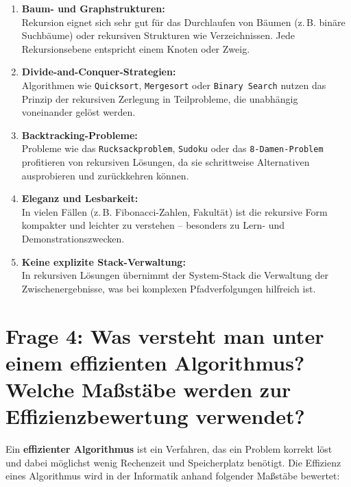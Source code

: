 \documentclass{article}
\begin{document}
	\begin{enumerate}
		\item \textbf{Baum- und Graphstrukturen:} \\
		Rekursion eignet sich sehr gut für das Durchlaufen von Bäumen (z.\,B. binäre Suchbäume) oder rekursiven Strukturen wie Verzeichnissen. Jede Rekursionsebene entspricht einem Knoten oder Zweig.
		
		\item \textbf{Divide-and-Conquer-Strategien:} \\
		Algorithmen wie \texttt{Quicksort}, \texttt{Mergesort} oder \texttt{Binary Search} nutzen das Prinzip der rekursiven Zerlegung in Teilprobleme, die unabhängig voneinander gelöst werden.
		
		\item \textbf{Backtracking-Probleme:} \\
		Probleme wie das \texttt{Rucksackproblem}, \texttt{Sudoku} oder das \texttt{8-Damen-Problem} profitieren von rekursiven Lösungen, da sie schrittweise Alternativen ausprobieren und zurückkehren können.
		
		\item \textbf{Eleganz und Lesbarkeit:} \\
		In vielen Fällen (z.\,B. Fibonacci-Zahlen, Fakultät) ist die rekursive Form kompakter und leichter zu verstehen – besonders zu Lern- und Demonstrationszwecken.
		
		\item \textbf{Keine explizite Stack-Verwaltung:} \\
		In rekursiven Lösungen übernimmt der System-Stack die Verwaltung der Zwischenergebnisse, was bei komplexen Pfadverfolgungen hilfreich ist.
	\end{enumerate}
	
		\section*{Frage 4: Was versteht man unter einem effizienten Algorithmus? Welche Maßstäbe werden zur Effizienzbewertung verwendet?}
		
		Ein \textbf{effizienter Algorithmus} ist ein Verfahren, das ein Problem korrekt löst und dabei möglichst wenig Rechenzeit und Speicherplatz benötigt. Die Effizienz eines Algorithmus wird in der Informatik anhand folgender Maßstäbe bewertet:
		
\end{document}
